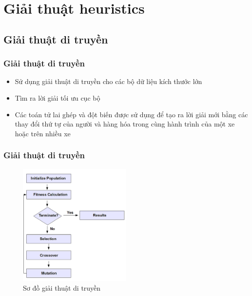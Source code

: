 \documentclass{beamer}
\begin{document}
	
	\section{Giải thuật heuristics}
	
	
	\subsection{Giải thuật di truyền}
	
	\begin{frame}
		\frametitle{Giải thuật di truyền}
		\begin{itemize}
			\item Sử dụng giải thuật di truyền cho các bộ dữ liệu kích thước lớn
			\item Tìm ra lời giải tối ưu cục bộ
			\item Các toán tử lai ghép và đột biến được sử dụng để tạo ra lời giải mới bằng các thay đổi thứ tự của người và hàng hóa trong cùng hành trình của một xe hoặc trên nhiều xe
		\end{itemize}
	\end{frame}
	
	\begin{frame}
		\frametitle{Giải thuật di truyền}
		\begin{figure}
			\centering
			\caption{Sơ đồ giải thuật di truyền}
			\includegraphics[width=0.5\textwidth]{images/ga-flow.png}
		\end{figure}
	\end{frame}
\end{document}
